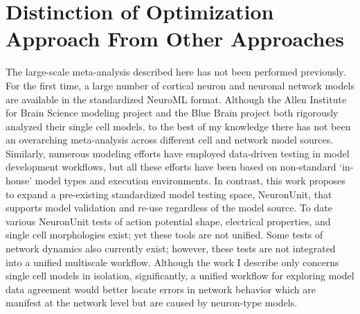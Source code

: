 




\section{Distinction of Optimization Approach From Other Approaches}
The large-scale meta-analysis described here has not been performed previously. For the first time, a large number of cortical neuron and neuronal network models are available in the standardized NeuroML format. Although the Allen Institute for Brain Science modeling project and the Blue Brain project both rigorously analyzed their single cell models, to the best of my knowledge there has not been an overarching meta-analysis across different cell and network model sources.\\

Similarly, numerous modeling efforts have employed data-driven testing in model development workflows, but all these efforts have been based on non-standard ‘in-house’ model types and execution environments. In contrast, this work proposes to expand a pre-existing standardized model testing space, NeuronUnit, that supports model validation and re-use regardless of the model source. To date various NeuronUnit tests of action potential shape, electrical properties, and single cell morphologies exist; yet these tools are not unified. Some tests of network dynamics also currently exist; however, these tests are not integrated into a unified multiscale workflow. Although the work I describe only concerns single cell models in isolation, significantly, a unified workflow for exploring model data agreement would better locate errors in network behavior which are manifest at the network level but are caused by neuron-type models.

